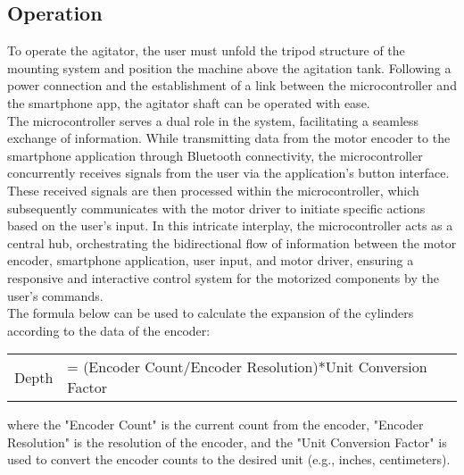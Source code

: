 \documentclass[a4,10pt]{report}
\begin{document}
\begin{enumerate}
\section{Operation}
To operate the agitator, the user must unfold the tripod structure of the mounting system and position the machine above the agitation tank. Following a power connection and the establishment of a link between the microcontroller and the smartphone app, the agitator shaft can be operated with ease.
\vspace{2mm} \\
The microcontroller serves a dual role in the system, facilitating a seamless exchange of information. While transmitting data from the motor encoder to the smartphone application through Bluetooth connectivity, the microcontroller concurrently receives signals from the user via the application's button interface. These received signals are then processed within the microcontroller, which subsequently communicates with the motor driver to initiate specific actions based on the user's input. In this intricate interplay, the microcontroller acts as a central hub, orchestrating the bidirectional flow of information between the motor encoder, smartphone application, user input, and motor driver, ensuring a responsive and interactive control system for the motorized components by the user's commands. 
\vspace{2mm} \\
The formula below can be used to calculate the expansion of the cylinders according to the data of the encoder: \\
\begin{tabular}{r l}
    Depth &= (Encoder Count$/$Encoder Resolution)$*$Unit Conversion Factor \\
\end{tabular}
\par where the "Encoder Count" is the current count from the encoder, "Encoder Resolution" is the resolution of the encoder, and the "Unit Conversion Factor" is used to convert the encoder counts to the desired unit (e.g., inches, centimeters).

\end{enumerate}

\end{document}
